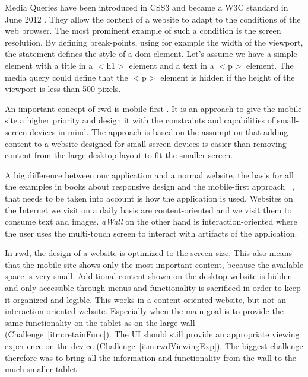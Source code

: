 \documentclass{sigchi}
\begin{document}
Media Queries have been introduced in CSS3 and became a W3C standard in June 2012 \cite{mediaqueriesW3C}.
They allow the content of a website to adapt to the conditions of the web browser.
The most prominent example of such a condition is the screen resolution.
By defining break-points, using for example the width of the viewport, the statement defines the style of a \gls{dom} element.
Let's assume we have a simple element with a title in a $<$h1$>$ element and a text in a $<$p$>$ element.
The media query could define that the $<$p$>$ element is hidden if the height of the viewport is less than 500 pixels.

An important concept of \gls{rwd} is mobile-first \cite{Wroblewski:2011}. 
It is an approach to give the mobile site a higher priority and design it with the constraints and capabilities of small-screen devices in mind. 
The approach is based on the assumption that adding content to a website designed for small-screen devices is easier than removing content from the large desktop layout to fit the smaller screen.

A big difference between our application and a normal website, the basis for all the examples in books about responsive design and the mobile-first approach ~\cite{Marcotte:2011,Wroblewski:2011}, that needs to be taken into account is how the application is used.
Websites on the Internet we visit on a daily basis are content-oriented and we visit them to consume text and images.
\textit{aWall} on the other hand is interaction-oriented where the user uses the multi-touch screen to interact with artifacts of the application.

In \gls{rwd}, the design of a website is optimized to the screen-size.
This also means that the mobile site shows only the most important content, because the available space is very small.
Additional content shown on the desktop website is hidden and only accessible through menus and functionality is sacrificed in order to  keep it organized and legible. 
This works in a content-oriented website, but not an interaction-oriented website.
Especially when the main goal is to provide the same functionality on the tablet as on the large wall (Challenge~\ref{itm:retainFunc}).
The UI should still provide an appropriate viewing experience on the device (Challenge~\ref{itm:rwdViewingExp}).
The biggest challenge therefore was to bring all the information and functionality from the wall to the much smaller tablet.
\end{document}
